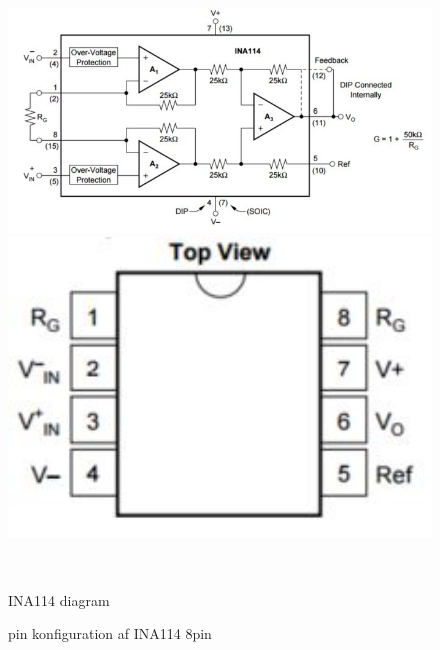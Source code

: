  \begin{figure}[htbp] \centering
\begin{minipage}[b]{0.48\textwidth} \centering
\includegraphics[width=1.00\textwidth]{billeder/Hardware/INA114diagram.JPG} %
\end{minipage} \hfill
\begin{minipage}[b]{0.48\textwidth} \centering
\includegraphics[width=1.00\textwidth]{billeder/Hardware/pinkonfig.JPG} %
\end{minipage} \\ %
\begin{minipage}[t]{0.48\textwidth}
\caption{INA114 diagram} %
\label{fig:INA114diagram}
\end{minipage} \hfill
\begin{minipage}[t]{0.48\textwidth}
\caption{pin konfiguration af INA114 8pin } %
\label{fig:INA114Pin}
\end{minipage}
\end{figure}

